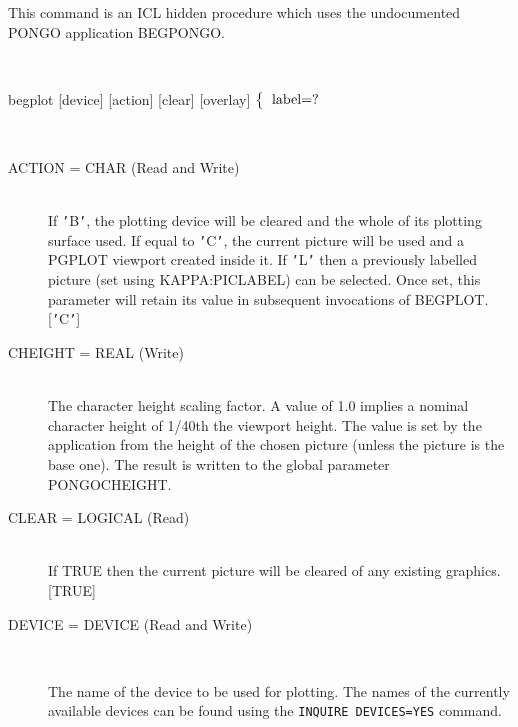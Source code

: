 \documentclass[twoside,11pt]{article}
\newcommand{\htmlref}[2]{#1}
\renewcommand{\_}{\texttt{\symbol{95}}}
\newcommand{\cnam}[1]{{\tt #1}}
\newcommand{\iref} [1]{\htmlref{#1}{#1}}
\newcommand{\sstusage}[1]{\item[Usage:] \mbox{}
\\[1.3ex]{\raggedright \ssttt #1}}
\newcommand{\sstparameters}[1]{
   \item[Parameters:] \mbox{} \\
   \vspace{-3.5ex}
   \begin{description}
      #1
   \end{description}
}
\newcommand{\sstsubsection}[1]{ \item[{#1}] \mbox{} \\}
\newcommand{\sstusage}[1]{\item[Usage:]
      \begin{description}
         {\ssttt #1}
      \end{description}
      \\
   }
\newcommand{\sstparameters}[1]{
      \item[Parameters:] \\
      \begin{description}
         #1
      \end{description}
      \\
   }
\newcommand{\sstsubsection}[1]{\item[{#1}]}
\begin{document}
\begin{sloppypar}
{{      This command is an ICL hidden procedure which uses the
      undocumented PONGO application BEGPONGO.
   }
   \sstusage {
      begplot [device] [action] [clear] [overlay]
        \newline\hspace*{1.5em}
        $\left\{ {\begin{tabular}{l}
                                      label=? \\
                  \end{tabular} }
        \right.$
        \newline\hspace*{1.9em}
        \makebox[0mm][c]{\small action}
   }
   \sstparameters{
      \sstsubsection{
         ACTION = \_CHAR (Read and Write)
      }{
         If {\tt '}B{\tt '}, the plotting device will be cleared and the whole of
         its plotting surface used. If equal to {\tt '}C{\tt '}, the current picture
         will be used and a PGPLOT viewport created inside it. If {\tt '}L{\tt '}
         then a previously labelled picture (set using KAPPA:PICLABEL)
         can be selected. Once set, this parameter will retain its value
         in subsequent invocations of BEGPLOT.
         [{\tt '}C{\tt '}]
      }
      \sstsubsection{
         CHEIGHT = \_REAL (Write)
      }{
         The character height scaling factor. A value of 1.0 implies a
         nominal character height of 1/40th the viewport height. The
         value is set by the application from the height of the chosen
         picture (unless the picture is the base one). The result is
         written to the global parameter PONGO\_CHEIGHT.
      }
      \sstsubsection{
         CLEAR = \_LOGICAL (Read)
      }{
         If TRUE then the current picture will be cleared of any
         existing graphics.
         [TRUE]
      }
      \sstsubsection{
         DEVICE = DEVICE (Read and Write)
      }{
         The name of the device to be used for plotting.  The names of
         the currently available devices can be found using the
         \cnam{\iref{INQUIRE} DEVICES=YES} command.

}}}
\end{sloppypar}
\end{document}
